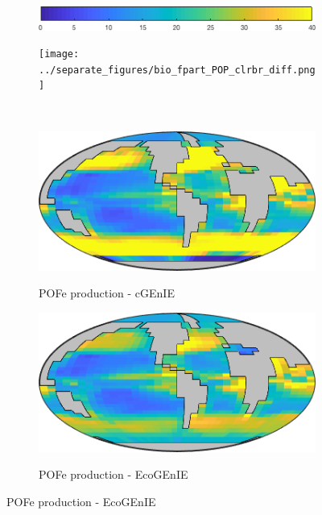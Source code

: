 \documentclass{article}
\begin{document}
\begin{figure}[htp]
\begin{subfigure}{.49\textwidth}
 \includegraphics[width=0.95\linewidth]{../separate_figures/ECOGEM/bio_fpart_POP_clrbr.png}
\end{subfigure}
\begin{subfigure}{.49\textwidth}
\texttt{[image: ../separate\_figures/bio\_fpart\_POP\_clrbr\_diff.png]}
\end{subfigure}
\\[+0.2cm]
\begin{subfigure}{.33\textwidth}
 \caption{POFe production - cGEnIE}
 \includegraphics[width=0.95\linewidth]{../separate_figures/BIOGEM/bio_fpart_POFe.png}
 \label{fig:dpCO2_1}
\end{subfigure}%
\begin{subfigure}{.33\textwidth}
 \caption{POFe production - EcoGEnIE}
 \includegraphics[width=0.95\linewidth]{../separate_figures/ECOGEM/bio_fpart_POFe.png}
 \label{fig:dpCO2_2}
\end{subfigure}

\end{figure}
\end{document}
